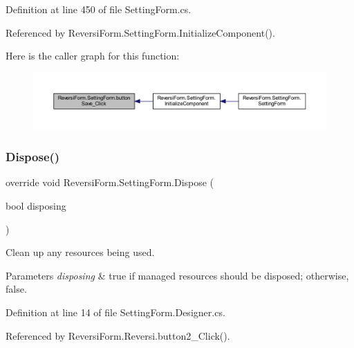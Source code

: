 Definition at line 450 of file Setting\+Form.\+cs.



Referenced by Reversi\+Form.\+Setting\+Form.\+Initialize\+Component().

Here is the caller graph for this function\+:\nopagebreak
\begin{figure}[H]
\begin{center}
\leavevmode
\includegraphics[width=350pt]{class_reversi_form_1_1_setting_form_aba7b2ad370dba451133448e702cf0944_icgraph}
\end{center}
\end{figure}
\mbox{\label{class_reversi_form_1_1_setting_form_ab4be09946d93ed193820f8d7acfc2cb5}} 
\subsubsection{\texorpdfstring{Dispose()}{Dispose()}}
{\footnotesize\ttfamily override void Reversi\+Form.\+Setting\+Form.\+Dispose (\begin{DoxyParamCaption}\item[{bool}]{disposing }\end{DoxyParamCaption})\hspace{0.3cm}{\ttfamily [protected]}}



Clean up any resources being used. 


\begin{DoxyParams}{Parameters}
{\em disposing} & true if managed resources should be disposed; otherwise, false.\\
\hline
\end{DoxyParams}


Definition at line 14 of file Setting\+Form.\+Designer.\+cs.



Referenced by Reversi\+Form.\+Reversi.\+button2\+\_\+\+Click().

